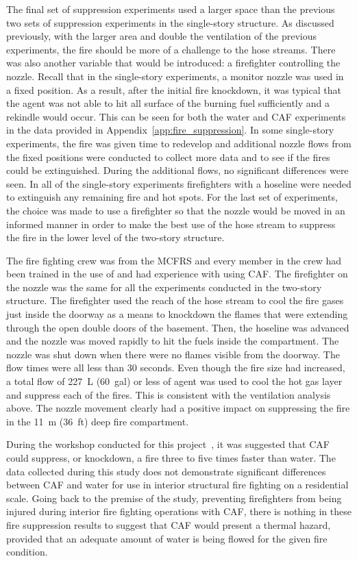 \documentclass[12pt,oneside]{book}
\begin{document}
The final set of suppression experiments used a larger space than the previous two sets of suppression experiments in the single-story structure. As discussed previously, with the larger area and double the ventilation of the previous experiments, the fire should be more of a challenge to the hose streams. There was also another variable that would be introduced: a firefighter controlling the nozzle. Recall that in the single-story experiments, a monitor nozzle was used in a fixed position. As a result, after the initial fire knockdown, it was typical that the agent was not able to hit all surface of the burning fuel sufficiently and a rekindle would occur. This can be seen for both the water and CAF experiments in the data provided in Appendix~\ref{app:fire_suppression}. In some single-story experiments, the fire was given time to redevelop and additional nozzle flows from the fixed positions were conducted to collect more data and to see if the fires could be extinguished. During the additional flows, no significant differences were seen. In all of the single-story experiments firefighters with a hoseline were needed to extinguish any remaining fire and hot spots. For the last set of experiments, the choice was made to use a firefighter so that the nozzle would be moved in an informed manner in order to make the best use of the hose stream to suppress the fire in the lower level of the two-story structure.  

The fire fighting crew was from the MCFRS and every member in the crew had been trained in the use of and had experience with using CAF. The firefighter on the nozzle was the same for all the experiments conducted in the two-story structure. The firefighter used the reach of the hose stream to cool the fire gases just inside the doorway as a means to knockdown the flames that were extending through the open double doors of the basement. Then, the hoseline was advanced and the nozzle was moved rapidly to hit the fuels inside the compartment. The nozzle was shut down when there were no flames visible from the doorway. The flow times were all less than 30 seconds. Even though the fire size had increased, a total flow of 227~L (60~gal) or less of agent was used to cool the hot gas layer and suppress each of the fires. This is consistent with the ventilation analysis above. The nozzle movement clearly had a positive impact on suppressing the fire in the 11~m (36~ft) deep fire compartment.    

During the workshop conducted for this project~\cite{Grant:2011}, it was suggested that CAF could suppress, or knockdown, a fire three to five times faster than water. The data collected during this study does not demonstrate significant differences between CAF and water for use in interior structural fire fighting on a residential scale. Going back to the premise of the study, preventing firefighters from being injured during interior fire fighting operations with CAF, there is nothing in these fire suppression results to suggest that CAF would present a thermal hazard, provided that an adequate amount of water is being flowed for the given fire condition.
\end{document}

